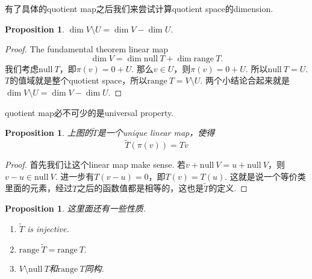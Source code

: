 \documentclass{article}
\newtheorem{proposition}[theorem]{Proposition}
\newcommand\nul[1]{\text{null}\ #1}
\newcommand\range[1]{\text{range}\ #1}
\begin{document}
{\color{red} 有了具体的quotient map之后我们来尝试计算quotient space的dimension}.

\begin{proposition}
$\dim V\setminus U = \dim V - \dim U.$
\end{proposition}

\begin{proof}
The fundamental theorem linear map
$$
\dim V  = \dim\nul{T} + \dim\range{T}.
$$
我们考虑$\nul{T}$，即$\pi(v) =  0 + U$. 那么$v \in U$，则$\pi(v) = 0 +U$. 所以$\nul{T} = U$. $T$的值域就是整个quotient space，所以$\range{T} = V\setminus U$. 两个小结论合起来就是$\dim V\setminus U = \dim V - \dim U$. 
\end{proof}

{\color{red} quotient map必不可少的是universal property}.

\begin{center}
\end{center}

\begin{proposition}
\rm 上图的$\tilde{T}$是一个unique linear map，使得
$$
\tilde{T}(\pi(v)) = Tv 
$$
\end{proposition}

\begin{proof}
首先我们让这个linear map make sense. 若$v+\nul{V} = u+\nul{V}$，则$v - u \in \nul{V}$. 进一步有$T(v-u)=0$，即$T(v)=T(u)$. 这就是说一个等价类里面的元素，经过$T$之后的函数值都是相等的，这也是$\tilde{T}$的定义.
\end{proof}

\begin{proposition}
\rm 这里面还有一些性质.
\begin{enumerate}
	\item $\tilde{T}$ is injective.
	\item $\range{\tilde{T}} = \range{T}.$
	\item $V\setminus \nul{T}$和$\range{T}$同构.
\end{enumerate}
\end{proposition}
\end{document}
